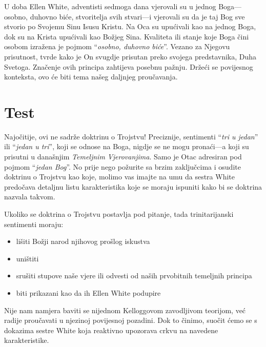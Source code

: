 U doba Ellen White, adventisti sedmoga dana vjerovali su u jednog Boga—osobno, duhovno biće, stvoritelja svih stvari—i vjerovali su da je taj Bog sve stvorio po Svojemu Sinu Isusu Kristu. Na Oca su upućivali kao na jednog Boga, dok su na Krista upućivali kao Božjeg Sina. Kvaliteta ili stanje koje Boga čini osobom izražena je pojmom “\textit{osobno, duhovno biće}”. Vezano za Njegovu prisutnost,  tvrde kako je On svugdje prisutan preko svojega predstavnika, Duha Svetoga. Značenje ovih principa zahtijeva posebnu pažnju. Držeći se povijesnog konteksta, ovo će biti tema našeg daljnjeg proučavanja.

\section*{Test}

Najočitije, ovi  ne sadrže doktrinu o Trojstvu! Preciznije, sentimenti “\textit{tri u jedan}” ili “\textit{jedan u tri}”, koji se odnose na Boga, nigdje se ne mogu pronaći—a koji su prisutni u današnjim \textit{Temeljnim Vjerovanjima}. Samo je Otac adresiran pod pojmom “\textit{jedan Bog}”. No prije nego požurite sa brzim zaključcima i osudite doktrinu o Trojstvu kao koje, molimo vas imajte na umu da sestra White predočava detaljnu listu karakteristika koje se moraju ispuniti kako bi se doktrina nazvala takvom.

Ukoliko se doktrina o Trojstvu postavlja pod pitanje, tada trinitarijanski sentimenti moraju:
\begin{itemize}
    \item lišiti Božji narod njihovog prošlog iskustva
    \item uništiti 
    \item srušiti stupove naše vjere ili odvesti od naših prvobitnih temeljnih principa
    \item biti prikazani kao da ih Ellen White podupire
\end{itemize}

Nije nam namjera baviti se nijednom Kelloggovom zavodljivom teorijom, već radije proučavati  u njezinoj povijesnoj pozadini. Dok to činimo, suočit ćemo se s dokazima sestre White koja reaktivno upozorava crkvu na navedene karakteristike.

